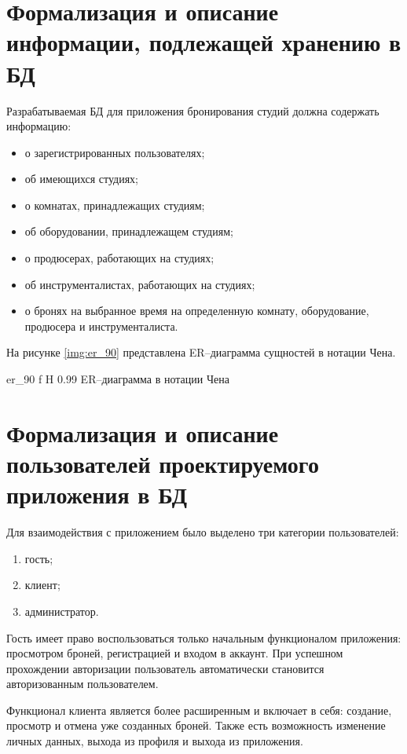\section{Формализация и описание информации, подлежащей хранению в БД}
Разрабатываемая БД для приложения бронирования студий должна содержать информацию:
\begin{itemize}
	\item о зарегистрированных пользователях;
	\item об имеющихся студиях;
	\item о комнатах, принадлежащих студиям;
	\item об оборудовании, принадлежащем студиям;
	\item о продюсерах, работающих на студиях;
	\item об инструменталистах, работающих на студиях;
	\item о бронях на выбранное время на определенную комнату, оборудование, продюсера и инструменталиста.
\end{itemize}

На рисунке \ref{img:er_90} представлена ER--диаграмма сущностей в нотации Чена.



{er_90} %
{f} %
{H} %
{0.99\textwidth} %
{ER--диаграмма в нотации Чена} %



\section{Формализация и описание пользователей проектируемого приложения в БД}
Для взаимодействия с приложением было выделено три категории пользователей:
\begin{enumerate}
	\item гость;
	\item клиент;
	\item администратор.
\end{enumerate}

Гость имеет право воспользоваться только начальным функционалом приложения: просмотром броней, регистрацией и входом в аккаунт.
При успешном прохождении авторизации пользователь автоматически становится авторизованным пользователем.

Функционал клиента является более расширенным и включает в себя: создание, просмотр и отмена уже созданных броней. 
Также есть возможность изменение личных данных, выхода из профиля и выхода из приложения.

